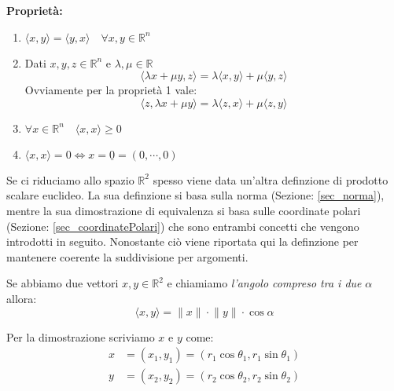 \textbf{Proprietà:}
\begin{enumerate}
	\item $\langle x, y \rangle = \langle y, x \rangle \quad \forall x, y \in 
        \mathbb{R}^n$

	\item Dati $x, y, z \in \mathbb{R}^n$ e $\lambda, \mu \in \mathbb{R}$ 
		\begin{equation*}
			\langle \lambda x + \mu y, z \rangle = \lambda \langle x, y 
            \rangle + \mu \langle y, z \rangle
		\end{equation*}
		Ovviamente per la proprietà 1 vale:
		\begin{equation*}
			\langle z, \lambda x + \mu y \rangle = \lambda \langle z, x 
            \rangle + \mu \langle z, y \rangle
		\end{equation*}

	\item $\forall x \in \mathbb{R}^n \quad \langle x, x \rangle \geq 0$
	
	\item $\langle x, x \rangle = 0 \iff x = \underline{0} = (0, \cdots, 0)$
\end{enumerate}

Se ci riduciamo allo spazio $\mathbb{R}^2$ spesso viene data un'altra 
definzione di prodotto scalare euclideo. La sua definzione si basa sulla norma 
(Sezione: \ref{sec_norma}), mentre la sua dimostrazione di equivalenza si 
basa sulle coordinate polari (Sezione: \ref{sec_coordinatePolari}) che sono 
entrambi concetti che vengono introdotti in seguito. Nonostante ciò viene 
riportata qui la definzione per mantenere coerente la suddivisione per 
argomenti. 

Se abbiamo due vettori $x, y \in \mathbb{R}^2$ e chiamiamo \textit{l'angolo 
compreso tra i due} $\alpha$ allora:
\begin{equation*}
	\langle x, y \rangle = \lVert x \rVert \cdot \lVert y \rVert \cdot 
    \cos{\alpha}
\end{equation*}

Per la dimostrazione scriviamo $x$ e $y$ come:
\begin{align*}
	x &= (x_1, y_1) = (r_1\cos{\theta_1}, r_1\sin{\theta_1}) \\
	y &= (x_2, y_2) = (r_2\cos{\theta_2}, r_2\sin{\theta_2})
\end{align*}

